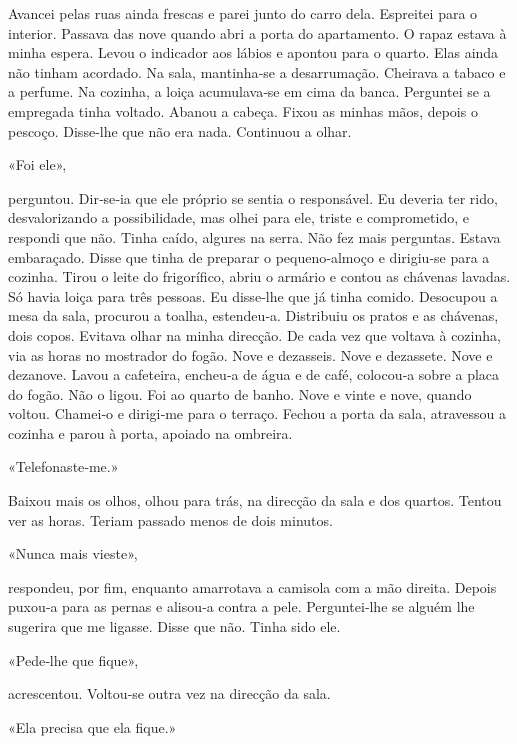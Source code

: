 Avancei pelas ruas ainda frescas e parei junto do carro dela. Espreitei
para o interior. Passava das nove quando abri a porta do apartamento. O
rapaz estava à minha espera. Levou o indicador aos lábios e apontou para
o quarto. Elas ainda não tinham acordado. Na sala, mantinha­‑se a
desarrumação. Cheirava a tabaco e a perfume. Na cozinha, a loiça
acumulava­‑se em cima da banca. Perguntei se a empregada tinha voltado.
Abanou a cabeça. Fixou as minhas mãos, depois o pescoço. Disse­‑lhe que
não era nada. Continuou a olhar.

«Foi ele»,

perguntou. Dir­‑se­‑ia que ele próprio se sentia o responsável. Eu
deveria ter rido, desvalorizando a possibilidade, mas olhei para ele,
triste e comprometido, e respondi que não. Tinha caído, algures na
serra. Não fez mais perguntas. Estava embaraçado. Disse que tinha de
preparar o pequeno­‑almoço e dirigiu­‑se para a cozinha. Tirou o leite
do frigorífico, abriu o armário e contou as chávenas lavadas. Só havia
loiça para três pessoas. Eu disse­‑lhe que já tinha comido. Desocupou a
mesa da sala, procurou a toalha, estendeu­‑a. Distribuiu os pratos e as
chávenas, dois copos. Evitava olhar na minha direcção. De cada vez que
voltava à cozinha, via as horas no mostrador do fogão. Nove e dezasseis.
Nove e dezassete. Nove e dezanove. Lavou a cafeteira, encheu­‑a de água
e de café, colocou­‑a sobre a placa do fogão. Não o ligou. Foi ao quarto
de banho. Nove e vinte e nove, quando voltou. Chamei­‑o e dirigi­‑me
para o terraço. Fechou a porta da sala, atravessou a cozinha e parou à
porta, apoiado na ombreira.

«Telefonaste­‑me.»

Baixou mais os olhos, olhou para trás, na direcção da sala e dos
quartos. Tentou ver as horas. Teriam passado menos de dois minutos.

«Nunca mais vieste»,

respondeu, por fim, enquanto amarrotava a camisola com a mão direita.
Depois puxou­‑a para as pernas e alisou­‑a contra a pele. Perguntei­‑lhe
se alguém lhe sugerira que me ligasse. Disse que não. Tinha sido ele.

«Pede­‑lhe que fique»,

acrescentou. Voltou­‑se outra vez na direcção da sala.

«Ela precisa que ela fique.»

